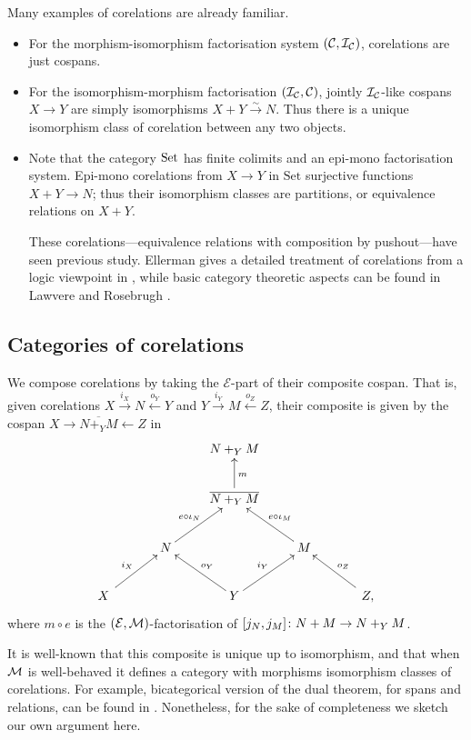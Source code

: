 \begin{examples} \label{ex.corels}
  Many examples of corelations are already familiar.
  \begin{itemize}
    \item For the morphism-isomorphism factorisation system $(\mathcal C,\mathcal I_{\mathcal
      C})$, corelations are just cospans.
    \item For the isomorphism-morphism factorisation $(\mathcal I_{\mathcal C}, \mathcal C)$,
      jointly $\mathcal I_{\mathcal C}$-like cospans $X \to Y$ are simply isomorphisms
      $X+Y \stackrel\sim\to N$. Thus there is a unique isomorphism class of
      corelation between any two objects.
    \item Note that the category $\mathrm{Set}$ has finite colimits and an epi-mono
      factorisation system. Epi-mono corelations from $X \to Y$ in $\mathrm{Set}$
      surjective functions $X+Y \to N$; thus their isomorphism classes are
      partitions, or equivalence relations on $X+Y$. 

      These corelations---equivalence relations with composition by
      pushout---have seen previous study. Ellerman gives a detailed treatment of
      corelations from a logic viewpoint in \cite{E}, while basic category
      theoretic aspects can be found in Lawvere and Rosebrugh \cite{LR}.  
  \end{itemize}
\end{examples}

\subsection{Categories of corelations}

We compose corelations by taking the $\mathcal E$-part of their composite
cospan. That is, given corelations $X \stackrel{i_X}{\longrightarrow} N
\stackrel{o_Y}{\longleftarrow} Y$ and $Y \stackrel{i_Y}{\longrightarrow} M
\stackrel{o_Z}{\longleftarrow} Z$, their composite is given by the cospan $X
\to \overline{N+_YM} \leftarrow Z$ in
\[
  \xymatrix{
    && N+_YM \\
    && \overline{N+_YM} \ar[u]_{m} \\
    & N \ar[ur]^{e \circ \iota_N} && M \ar[ul]_{e \circ \iota_M} \\
    \quad X \quad \ar[ur]^{i_X} && Y \ar[ul]_{o_Y} \ar[ur]^{i_Y} && \quad Z, \quad \ar[ul]_{o_Z}
  }
\]
where $m \circ e$ is the $(\mathcal E,\mathcal M)$-factorisation of $[j_N,j_M]{\colon} N+M
\to N+_YM$. 

It is well-known that this composite is unique up to isomorphism, and that when
$\mathcal M$ is well-behaved it defines a category with morphisms isomorphism classes
of corelations. For example, bicategorical version of the dual theorem, for
spans and relations, can be found in \cite{JW}. Nonetheless, for the sake of
completeness we sketch our own argument here.

